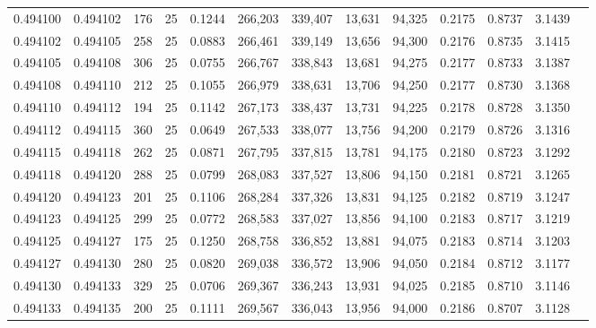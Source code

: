 \begin{tabular}{rrrrrrrrrrrrr}
0.494100 & 0.494102 &   176 &  25 &                                     0.1244 & 266,203 & 339,407 &  13,631 &  94,325 & 0.2175 & 0.8737 & 3.1439 \\
0.494102 & 0.494105 &   258 &  25 &                                     0.0883 & 266,461 & 339,149 &  13,656 &  94,300 & 0.2176 & 0.8735 & 3.1415 \\
0.494105 & 0.494108 &   306 &  25 &                                     0.0755 & 266,767 & 338,843 &  13,681 &  94,275 & 0.2177 & 0.8733 & 3.1387 \\
0.494108 & 0.494110 &   212 &  25 &                                     0.1055 & 266,979 & 338,631 &  13,706 &  94,250 & 0.2177 & 0.8730 & 3.1368 \\
0.494110 & 0.494112 &   194 &  25 &                                     0.1142 & 267,173 & 338,437 &  13,731 &  94,225 & 0.2178 & 0.8728 & 3.1350 \\
0.494112 & 0.494115 &   360 &  25 &                                     0.0649 & 267,533 & 338,077 &  13,756 &  94,200 & 0.2179 & 0.8726 & 3.1316 \\
0.494115 & 0.494118 &   262 &  25 &                                     0.0871 & 267,795 & 337,815 &  13,781 &  94,175 & 0.2180 & 0.8723 & 3.1292 \\
0.494118 & 0.494120 &   288 &  25 &                                     0.0799 & 268,083 & 337,527 &  13,806 &  94,150 & 0.2181 & 0.8721 & 3.1265 \\
0.494120 & 0.494123 &   201 &  25 &                                     0.1106 & 268,284 & 337,326 &  13,831 &  94,125 & 0.2182 & 0.8719 & 3.1247 \\
0.494123 & 0.494125 &   299 &  25 &                                     0.0772 & 268,583 & 337,027 &  13,856 &  94,100 & 0.2183 & 0.8717 & 3.1219 \\
0.494125 & 0.494127 &   175 &  25 &                                     0.1250 & 268,758 & 336,852 &  13,881 &  94,075 & 0.2183 & 0.8714 & 3.1203 \\
0.494127 & 0.494130 &   280 &  25 &                                     0.0820 & 269,038 & 336,572 &  13,906 &  94,050 & 0.2184 & 0.8712 & 3.1177 \\
0.494130 & 0.494133 &   329 &  25 &                                     0.0706 & 269,367 & 336,243 &  13,931 &  94,025 & 0.2185 & 0.8710 & 3.1146 \\
0.494133 & 0.494135 &   200 &  25 &                                     0.1111 & 269,567 & 336,043 &  13,956 &  94,000 & 0.2186 & 0.8707 & 3.1128 \\

\end{tabular}
